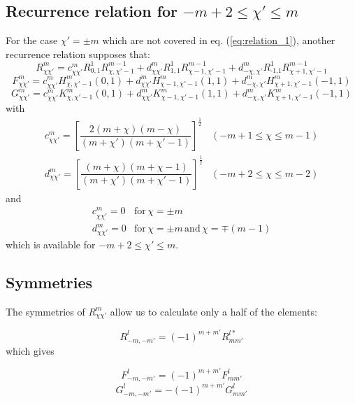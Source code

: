 \subsection{Recurrence relation for $-m+2\leq\chi'\leq m$}

For the case $\chi'=\pm m$ which are not covered in eq. (\ref{eq:relation_1}),
another recurrence relation supposes that:
\begin{equation}
R_{\chi\chi'}^{m}=c_{\chi\chi'}^{m}R_{0,1}^{1}R_{\chi,\chi'-1}^{m-1}+d_{\chi\chi'}^{m}R_{1,1}^{1}R_{\chi-1,\chi'-1}^{m-1}+d_{-\chi,\chi'}^{m}R_{\text{-1,}1}^{1}R_{\chi+1,\chi'-1}^{m-1}
\end{equation}
\begin{equation}
F_{\chi\chi'}^{m}=c_{\chi\chi'}^{m}H_{\chi,\chi'-1}^{m}(0,1)+d_{\chi\chi'}^{m}H_{\chi-1,\chi'-1}^{m}(1,1)+d_{-\chi,\chi'}^{m}H_{\chi+1,\chi'-1}^{m}(-1,1)
\end{equation}
\begin{equation}
G_{\chi\chi'}^{m}=c_{\chi\chi'}^{m}K_{\chi,\chi'-1}^{m}(0,1)+d_{\chi\chi'}^{m}K_{\chi-1,\chi'-1}^{m}(1,1)+d_{-\chi,\chi'}^{m}K_{\chi+1,\chi'-1}^{m}(-1,1)
\end{equation}
with
\begin{equation}
\begin{array}{ll}
c_{\chi\chi'}^{m}=\left[\dfrac{2\left(m+\chi\right)\left(m-\chi\right)}{\left(m+\chi'\right)\left(m+\chi'-1\right)}\right]^{\frac{1}{2}} & (-m+1\leq\chi\leq m-1)\\
d_{\chi\chi'}^{m}=\left[\dfrac{\left(m+\chi\right)\left(m+\chi-1\right)}{\left(m+\chi'\right)\left(m+\chi'-1\right)}\right]^{\frac{1}{2}} & (-m+2\leq\chi\leq m-2)
\end{array}
\end{equation}
and
\begin{equation}
\begin{array}{ll}
c_{\chi\chi'}^{m}=0 & \mathrm{for}\,\chi=\pm m\\
d_{\chi\chi'}^{m}=0 & \mathrm{for}\,\chi=\pm m\,\mathrm{and}\,\chi=\mp(m-1)
\end{array}
\end{equation}
which is available for $-m+2\leq\chi'\leq m$.


\subsection{Symmetries}

The symmetries of $R_{\chi\chi'}^{m}$ allow us to calculate only
a half of the elements: 

\begin{equation}
R_{-m,-m'}^{l}=\left(-1\right)^{m+m'}R_{mm'}^{l*}
\end{equation}
which gives

\begin{equation}
F_{-m,-m'}^{l}=\left(-1\right)^{m+m'}F_{mm'}^{l}
\end{equation}
\begin{equation}
G_{-m,-m'}^{l}=-\left(-1\right)^{m+m'}G_{mm'}^{l}
\end{equation}

